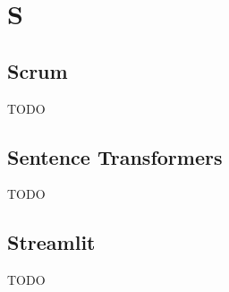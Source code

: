 \section{S}

\vspace{2em}
\subsection*{Scrum}
TODO

\vspace{2em}
\subsection*{Sentence Transformers}
TODO

\vspace{2em}
\subsection*{Streamlit}
TODO


